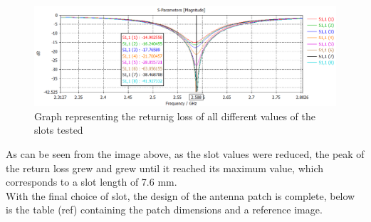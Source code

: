 \documentclass[]{article}
\begin{document}
  
  \begin{figure}[h]
  	\centering
  	\includegraphics[width=0.8\linewidth]{img/img10}
  	\caption{Graph representing the returnig loss of all different values of the slots tested}
  	\label{GSsweep}
  \end{figure}
  As can be seen from the image above, as the slot values were reduced, the peak of the return loss grew and grew until it reached its maximum value, which corresponds to a slot length of 7.6 mm.\\
  With the final choice of slot, the design of the antenna patch is complete, below is the table (ref) containing the patch dimensions and a reference image.\\
\end{document}
